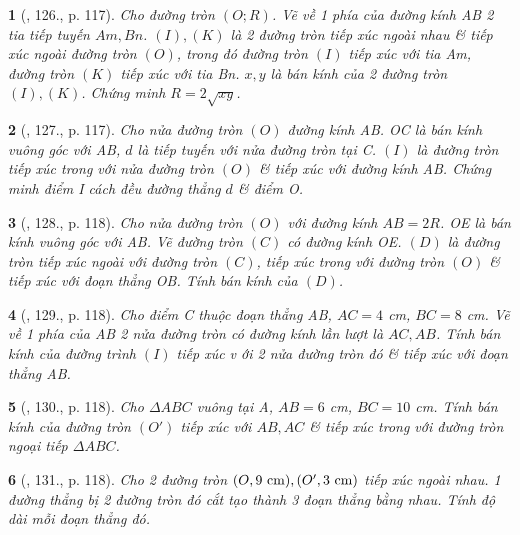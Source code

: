 \documentclass{article}
\newtheorem{baitoan}{}
\begin{document}
\begin{baitoan}[\cite{Binh_Toan_9_tap_1}, 126., p. 117]
	Cho đường tròn $(O;R)$. Vẽ về 1 phía của đường kính AB 2 tia tiếp tuyến $Am,Bn$. $(I),(K)$ là 2 đường tròn tiếp xúc ngoài nhau \& tiếp xúc ngoài đường tròn $(O)$, trong đó đường tròn $(I)$ tiếp xúc với tia Am, đường tròn $(K)$ tiếp xúc với tia Bn. $x,y$ là bán kính của 2 đường tròn $(I),(K)$. Chứng minh $R = 2\sqrt{xy}$.
\end{baitoan}

\begin{baitoan}[\cite{Binh_Toan_9_tap_1}, 127., p. 117]
	Cho nửa đường tròn $(O)$ đường kính AB. OC là bán kính vuông góc với AB, $d$ là tiếp tuyến với nửa đường tròn tại C. $(I)$ là đường tròn tiếp xúc trong với nửa đường tròn $(O)$ \& tiếp xúc với đường kính AB. Chứng minh điểm I cách đều đường thẳng $d$ \& điểm O.
\end{baitoan}

\begin{baitoan}[\cite{Binh_Toan_9_tap_1}, 128., p. 118]
	Cho nửa đường tròn $(O)$ với đường kính $AB = 2R$. OE là bán kính vuông góc với AB. Vẽ đường tròn $(C)$ có đường kính OE. $(D)$ là đường tròn tiếp xúc ngoài với đường tròn $(C)$, tiếp xúc trong với đường tròn $(O)$ \& tiếp xúc với đoạn thẳng OB. Tính bán kính của $(D)$.
\end{baitoan}

\begin{baitoan}[\cite{Binh_Toan_9_tap_1}, 129., p. 118]
	Cho điểm C thuộc đoạn thẳng AB, $AC = 4$ {\rm cm}, $BC = 8$ {\rm cm}. Vẽ về 1 phía của AB 2 nửa đường tròn có đường kính lần lượt là $AC,AB$. Tính bán kính của đường trình $(I)$ tiếp xúc v ới 2 nửa đường tròn đó \& tiếp xúc với đoạn thẳng AB.
\end{baitoan}

\begin{baitoan}[\cite{Binh_Toan_9_tap_1}, 130., p. 118]
	Cho $\Delta ABC$ vuông tại A, $AB = 6$ {\rm cm}, $BC = 10$ {\rm cm}. Tính bán kính của đường tròn $(O')$ tiếp xúc với $AB,AC$ \& tiếp xúc trong với đường tròn ngoại tiếp $\Delta ABC$.
\end{baitoan}

\begin{baitoan}[\cite{Binh_Toan_9_tap_1}, 131., p. 118]
	Cho 2 đường tròn $(O,9\ {\rm cm}),(O',3\ {\rm cm})$ tiếp xúc ngoài nhau. 1 đường thẳng bị 2 đường tròn đó cắt tạo thành 3 đoạn thẳng bằng nhau. Tính độ dài mỗi đoạn thẳng đó.
\end{baitoan}
\end{document}

